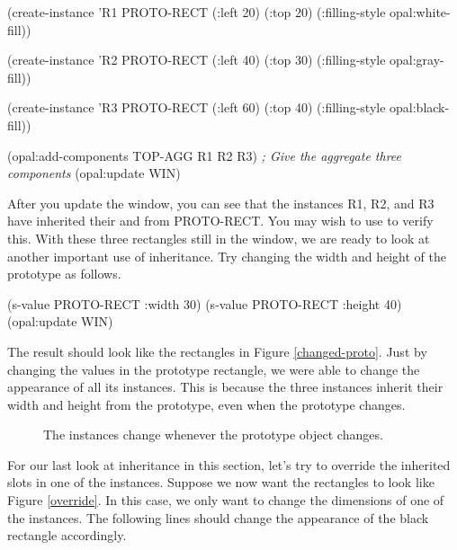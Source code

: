 \begin{programexample}
(create-instance 'R1 PROTO-RECT
   (:left 20) (:top 20)
   (:filling-style opal:white-fill))

(create-instance 'R2 PROTO-RECT
   (:left 40) (:top 30)
   (:filling-style opal:gray-fill))

(create-instance 'R3 PROTO-RECT
   (:left 60) (:top 40)
   (:filling-style opal:black-fill))

(opal:add-components TOP-AGG R1 R2 R3)  {\it ; Give the aggregate three components}
(opal:update WIN)
\end{programexample}

After you update the window, you can see that the instances R1, R2,
and R3 have inherited their  and  from
PROTO-RECT.  You may wish to use  to verify this.  With
these three rectangles still in the window, we are ready to look at
another important use of inheritance.  Try changing the width and
height of the prototype as follows.

\begin{programexample}
(s-value PROTO-RECT :width 30)
(s-value PROTO-RECT :height 40)
(opal:update WIN)
\end{programexample}

The result should look like the rectangles in Figure \ref{changed-proto}.
Just by changing the values in the prototype rectangle, we were able
to change the appearance of all its instances.  This is because the
three instances inherit their width and height from the prototype,
even when the prototype changes.

\begin{figure}
\begin{center}
\begin{makeimage}
\end{makeimage}
\begin{latexonly}
\end{latexonly}
\end{center}

\caption{The instances change whenever the prototype object changes.}
\end{figure}

For our last look at inheritance in this section, let's try to
override the inherited slots in one of the instances.  Suppose we now
want the rectangles to look like Figure \ref{override}.  In this case,
we only want to change the dimensions of one of the instances.  The
following lines should change the appearance of the black rectangle
accordingly.

